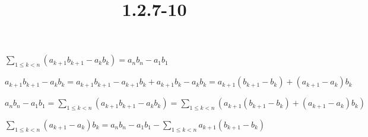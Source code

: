\documentclass{article}
\title{1.2.7-10}
\begin{document}
\maketitle

\( \sum_{1\leq k < n} (a_{k+1}b_{k+1} - a_{k}b_{k}) = a_nb_n - a_1b_1 \)

\( a_{k+1}b_{k+1} - a_{k}b_{k} = a_{k+1}b_{k+1} - a_{k+1}b_k + a_{k+1}b_k - a_{k}b_{k} = a_{k+1}(b_{k+1}-b_k) + (a_{k+1}-a_k)b_{k} \)

\( a_nb_n - a_1b_1 = \sum_{1\leq k < n} (a_{k+1}b_{k+1} - a_{k}b_{k}) = \sum_{1\leq k < n} (a_{k+1}(b_{k+1}-b_k) + (a_{k+1}-a_k)b_{k}) \)

\( \sum_{1\leq k < n}(a_{k+1}-a_k)b_k = a_nb_n - a_1b_1 - \sum_{1\leq k < n} a_{k+1}(b_{k+1}-b_k) \)
\end{document}
